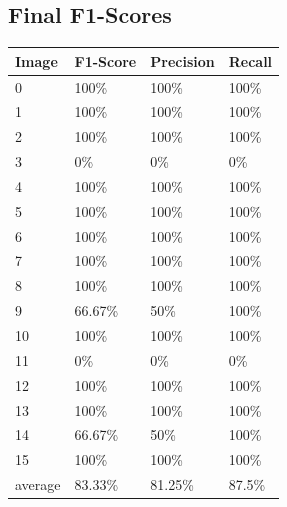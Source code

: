 \documentclass[conference]{IEEEtran}
\begin{document}
\subsection{Final F1-Scores}
\begin{center}
	\begin{tabular}{| l | l | l | l |}
		\hline
		Image & F1-Score & Precision & Recall \\ \hline
		0 & 100\% & 100\% & 100\% \\ \hline
		1 & 100\% & 100\% & 100\% \\ \hline
		2 & 100\% & 100\% & 100\% \\ \hline
		3 &  0\% & 0\% & 0\% \\ \hline
		4 & 100\% & 100\% & 100\% \\ \hline
		5 & 100\% & 100\% & 100\% \\ \hline
		6 & 100\%  & 100\% & 100\% \\ \hline
		7 & 100\% & 100\% & 100\%\\ \hline
		8 & 100\% & 100\% & 100\% \\ \hline
		9 & 66.67\% & 50\% & 100\% \\ \hline
		10 & 100\% & 100\% & 100\% \\ \hline
		11 & 0\% & 0\% & 0\% \\ \hline
		12 & 100\% & 100\% & 100\% \\ \hline
		13 & 100\% & 100\% & 100\% \\ \hline
		14 & 66.67\% & 50\% & 100\% \\ \hline
		15 & 100\% & 100\% & 100\%\\ \hline
		average & 83.33\% & 81.25\% & 87.5\% \\ \hline
	\end{tabular}
\end{center}
\end{document}
